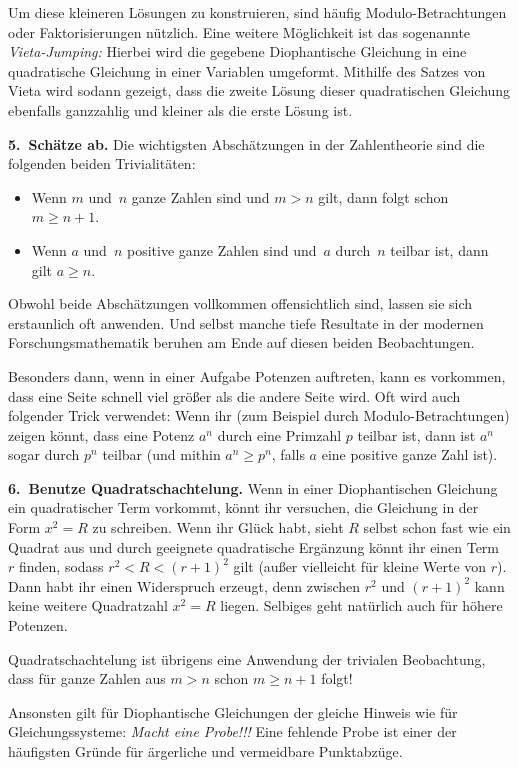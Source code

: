 Um diese kleineren Lösungen zu konstruieren, sind häufig Modulo-Betrachtungen oder Faktorisierungen nützlich. Eine weitere Möglichkeit ist das sogenannte \emph{Vieta-Jumping:} Hierbei wird die gegebene Diophantische Gleichung in eine quadratische Gleichung in einer Variablen umgeformt. Mithilfe des Satzes von Vieta wird sodann gezeigt, dass die zweite Lösung dieser quadratischen Gleichung ebenfalls ganzzahlig und kleiner als die erste Lösung ist.

\textbf{5.~Schätze ab.} Die wichtigsten Abschätzungen in der Zahlentheorie sind die folgenden beiden Trivialitäten:
\begin{itemize}
	\item Wenn $m$ und~$n$ ganze Zahlen sind und $m>n$ gilt, dann folgt schon $m\geqslant n+1$.
	\item Wenn $a$ und~$n$ positive ganze Zahlen sind und~$a$ durch~$n$ teilbar ist, dann gilt $a\geqslant n$.
\end{itemize}
Obwohl beide Abschätzungen vollkommen offensichtlich sind, lassen sie sich erstaunlich oft anwenden. Und selbst manche tiefe Resultate in der modernen Forschungsmathematik beruhen am Ende auf diesen beiden Beobachtungen.

Besonders dann, wenn in einer Aufgabe Potenzen auftreten, kann es vorkommen, dass eine Seite schnell viel größer als die andere Seite wird. Oft wird auch folgender Trick verwendet: Wenn ihr (zum Beispiel durch Modulo-Betrachtungen) zeigen könnt, dass eine Potenz $a^n$ durch eine Primzahl $p$ teilbar ist, dann ist $a^n$ sogar durch $p^n$ teilbar (und mithin $a^n\geqslant p^n$, falls $a$ eine positive ganze Zahl ist).

\textbf{6.~Benutze Quadratschachtelung.} Wenn in einer Diophantischen Gleichung ein quadratischer Term vorkommt, könnt ihr versuchen, die Gleichung in der Form $x^2=R$ zu schreiben. Wenn ihr Glück habt, sieht $R$ selbst schon fast wie ein Quadrat aus und durch geeignete quadratische Ergänzung könnt ihr einen Term~$r$ finden, sodass $r^2<R<(r+1)^2$ gilt (außer vielleicht für kleine Werte von $r$). Dann habt ihr einen Widerspruch erzeugt, denn zwischen $r^2$ und $(r+1)^2$ kann keine weitere Quadratzahl $x^2=R$ liegen. Selbiges geht natürlich auch für höhere Potenzen.

Quadratschachtelung ist übrigens eine Anwendung der trivialen Beobachtung, dass für ganze Zahlen aus $m>n$ schon $m\geqslant n+1$ folgt!

Ansonsten gilt für Diophantische Gleichungen der gleiche Hinweis wie für Gleichungssysteme: \emph{Macht eine Probe!!!} Eine fehlende Probe ist einer der häufigsten Gründe für ärgerliche und vermeidbare Punktabzüge.

